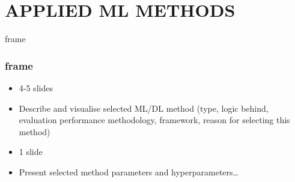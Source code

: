 \section{APPLIED ML METHODS}
\label{applied_ml_methods}


\begin{frame}{frame} %
    \frametitle{frame}
    \begin{itemize}
        \item 4-5 slides
        \item Describe and visualise selected ML/DL method (type, logic behind, evaluation performance methodology, framework, reason for selecting this method)
        \item 1 slide
        \item Present selected method parameters and hyperparameters…
    \end{itemize}
\end{frame}
